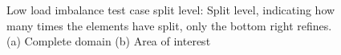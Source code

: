 \begin{figure}[H]
	\centering
	\hfill
	\caption{Low load imbalance test case split level: Split level, indicating how many times the elements have split, only the bottom right refines. (a) Complete domain (b) Area of interest}\label{fig:load_imbalance_case_low_s}
\end{figure}

